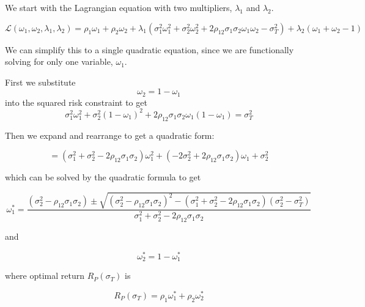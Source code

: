 \documentclass[11pt]{article}
\begin{document}
We start with the Lagrangian equation with two multipliers,
\(\lambda_1\) and \(\lambda_2\).

\[\mathcal{L}(\omega_1, \omega_2, \lambda_1, \lambda_2) = \rho_1 \omega_1 + \rho_2 \omega_2 + \lambda_1(\sigma_1^2 \omega_1^2 + \sigma_2^2 \omega_2^2 + 2\rho_{12} \sigma_1 \sigma_2 \omega_1 \omega_2 - \sigma_T^2) + \lambda_2(\omega_1 + \omega_2 - 1)\]

We can simplify this to a single quadratic equation, since we are
functionally solving for only one variable, \(\omega_1\).

First we substitute \[\omega_2 = 1 - \omega_1\] into the squared risk
constraint to get
\[\sigma_1^2 \omega_1^2 + \sigma_2^2 (1-\omega_1)^2 + 2 \rho_{12} \sigma_1 \sigma_2 \omega_1(1 - \omega_1) = \sigma_T^2\]

Then we expand and rearrange to get a quadratic form:

\[= (\sigma_1^2 + \sigma_2^2 - 2\rho_{12} \sigma_1 \sigma_2) \omega_1^2 + (-2\sigma_2^2 + 2\rho_{12} \sigma_1 \sigma_2)\omega_1 + \sigma_2^2\]

which can be solved by the quadratic formula to get

\[\omega_1^* = \frac{(\sigma_2^2 - \rho_{12}\sigma_1\sigma_2) \pm \sqrt{(\sigma_2^2 - \rho_{12}\sigma_1 \sigma_2)^2 - (\sigma_1^2 + \sigma_2^2 - 2\rho_{12} \sigma_1 \sigma_2)(\sigma_2^2 - \sigma_T^2)}}{\sigma_1^2 + \sigma_2^2 - 2\rho_{12}\sigma_1 \sigma_2}\]

and

\[\omega_2^* = 1 - \omega_1^*\]

where optimal return \(R_P(\sigma_T)\) is

\[R_P(\sigma_T) = \rho_1 \omega_1^* + \rho_2 \omega_2^*\]
\end{document}
